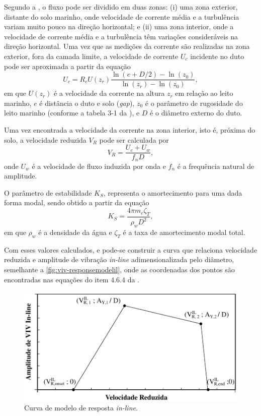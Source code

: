 Segundo a , o fluxo pode ser dividido em duas zonas: (i) uma zona exterior, distante do solo marinho, onde velocidade de corrente média e a turbulência variam muito pouco na direção horizontal; e (ii) uma zona interior, onde a velocidade de corrente média e a turbulência têm variações consideráveis na direção horizontal. Uma vez que as medições da corrente são realizadas na zona exterior, fora da camada limite, a velocidade de corrente $U_c$ incidente no duto pode ser aproximada a partir da equação
\begin{equation}
\label{eq:vel-corrente}
U_c = R_c U(z_r) \frac{\ln{(e+D/2)} - \ln(z_0)}{\ln (z_r)- \ln (z_0)},
\end{equation}
em que $U(z_r)$ é a velocidade da corrente na altura $z_r$ em relação ao leito marinho, $e$ é distância o duto e solo (\textit{gap}), $z_0$ é o parâmetro de rugosidade do leito marinho (conforme a tabela 3-1 da ), e $D$ é o diâmetro externo do duto. %

Uma vez encontrada a velocidade da corrente na zona interior, isto é, próxima do solo, a velocidade reduzida $V_R$ pode ser calculada por
\begin{equation}
\label{eq:viv-Vr}
V_R = \frac{U_c + U_w}{f_n D},
\end{equation}
onde $U_w$ é a velocidade de fluxo induzida por onda e $f_n$ é a frequência natural de amplitude.

O parâmetro de estabilidade $K_S$, representa o amortecimento para uma dada forma modal, sendo obtido a partir da equação
\begin{equation}
\label{eq:viv-Ks}
K_S = \frac{4 \pi m_e \zeta_T}{\rho_w D^2},
\end{equation}
em que $\rho_w$ é a densidade da água e $\zeta_T$ é a taxa de amortecimento modal total.

Com esses valores calculados, e pode-se construir a curva que relaciona velocidade reduzida e amplitude de vibração \textit{in-line} adimensionalizada pelo diâmetro, semelhante a \autoref{fig:viv-responsemodelil}, onde as coordenadas dos pontos são encontradas nas equações do item 4.6.4 da .

\begin{figure}[!ht]
    \centering
    \caption{Curva de modelo de resposta \textit{in-line}.}\label{fig:viv-responsemodelil}
    \includegraphics[width=0.65\linewidth]{imagens/response_model_IL}
\end{figure}

